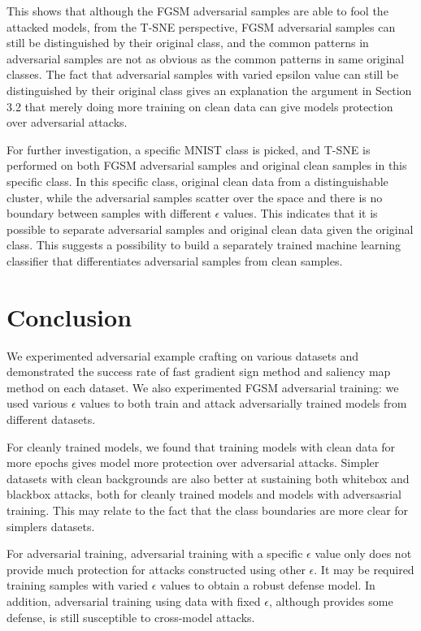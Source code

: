 \documentclass{article}
\begin{document}
This shows that although the FGSM adversarial samples are able to fool the attacked models, from the T-SNE perspective, FGSM adversarial samples can still be distinguished by their original class, and the common patterns in adversarial samples are not as obvious as the common patterns in same original classes.
The fact that adversarial samples with varied epsilon value can still be distinguished by their original class gives an explanation the argument in Section 3.2 that merely doing more training on clean data can give models protection over adversarial attacks.

For further investigation, a specific MNIST class is picked, and T-SNE is performed on both FGSM adversarial samples and original clean samples in this specific class.
In this specific class, original clean data from a distinguishable cluster, while the adversarial samples scatter over the space and there is no boundary between samples with different $\epsilon$ values.
This indicates that it is possible to separate adversarial samples and original clean data given the original class.
This suggests a possibility to build a separately trained machine learning classifier that differentiates adversarial samples from clean samples.


\section{Conclusion}

We experimented adversarial example crafting on various datasets and demonstrated the success rate of fast gradient sign method and saliency map method on each dataset.
We also experimented FGSM adversarial training: we used various $\epsilon$ values to both train and attack adversarially trained models from different datasets.

For cleanly trained models, we found that training models with clean data for more epochs gives model more protection over adversarial attacks. Simpler datasets with clean backgrounds are also better at sustaining both whitebox and blackbox attacks, both for cleanly trained models and models with adversasrial training. This may relate to the fact that the class boundaries are more clear for simplers datasets.

For adversarial training, adversarial training with a specific $\epsilon$ value only does not provide much protection for attacks constructed using other $\epsilon$. It may be required training samples with varied $\epsilon$ values to obtain a robust defense model. In addition, adversarial training using data with fixed $\epsilon$, although provides some defense, is still susceptible to cross-model attacks.
\end{document}

